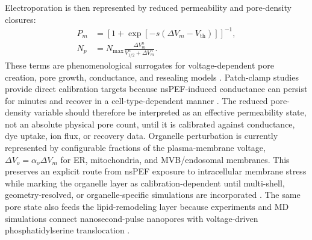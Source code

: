 Electroporation is then represented by reduced permeability and pore-density closures:
\[
\begin{aligned}
P_m &= \left[1+\exp[-s(\Delta V_m-V_{\mathrm{th}})]\right]^{-1}, \\
N_p &= N_{\max}
\frac{\Delta V_m^n}{V_{1/2}^n+\Delta V_m^n}.
\end{aligned}
\]
These terms are phenomenological surrogates for voltage-dependent pore creation, pore growth, conductance, and resealing models \cite{vasilkoski2006absolute,krassowska2007modeling}. Patch-clamp studies provide direct calibration targets because nsPEF-induced conductance can persist for minutes and recover in a cell-type-dependent manner \cite{pakhomov2007membrane,pakhomov2007long,nesin2012cell}. The reduced pore-density variable should therefore be interpreted as an effective permeability state, not an absolute physical pore count, until it is calibrated against conductance, dye uptake, ion flux, or recovery data. Organelle perturbation is currently represented by configurable fractions of the plasma-membrane voltage, $\Delta V_o=\alpha_o\Delta V_m$ for ER, mitochondria, and MVB/endosomal membranes. This preserves an explicit route from nsPEF exposure to intracellular membrane stress while marking the organelle layer as calibration-dependent until multi-shell, geometry-resolved, or organelle-specific simulations are incorporated \cite{semenov2013primary,beebe2012transient,baker2024numerical}. The same pore state also feeds the lipid-remodeling layer because experiments and MD simulations connect nanosecond-pulse nanopores with voltage-driven phosphatidylserine translocation \cite{vernier2006nanoporeJACS,vernier2006nanoporePhysBio}.

